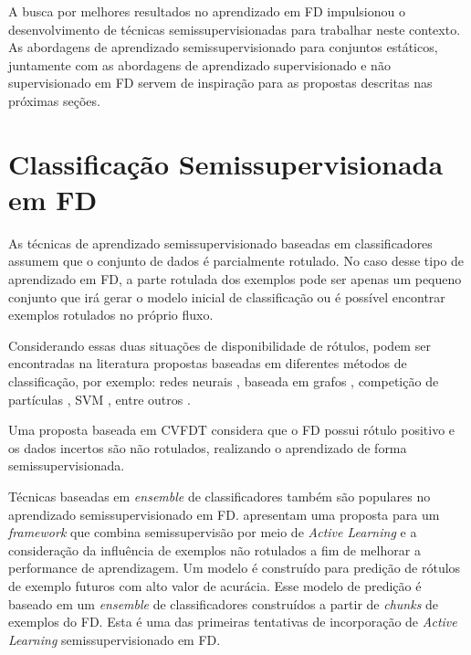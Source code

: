 
A busca por melhores resultados no aprendizado em FD impulsionou o desenvolvimento de técnicas semissupervisionadas para trabalhar neste contexto. As abordagens de aprendizado semissupervisionado para conjuntos estáticos, juntamente com as abordagens de aprendizado supervisionado e não supervisionado em FD servem de inspiração para as propostas descritas nas próximas seções.

\section{Classificação Semissupervisionada em FD}

As técnicas de aprendizado semissupervisionado baseadas em classificadores assumem que o conjunto de dados é parcialmente rotulado. No caso desse tipo de aprendizado em FD, a parte rotulada dos exemplos pode ser apenas um pequeno conjunto que irá gerar o modelo inicial de classificação ou é possível encontrar exemplos rotulados no próprio fluxo.

Considerando essas duas situações de disponibilidade de rótulos, podem ser encontradas na literatura propostas baseadas em diferentes métodos de classificação, por exemplo: redes neurais \cite{Leite2010,Astudillo2011,Astudillo2013,Bouguelia2013,Kasabov2013}, baseada em grafos \cite{Tiwari2010,Bertini2012,Bertini2013}, competição de partículas \cite{Breve2012,Breve2013}, SVM \cite{Frandina2013}, entre outros \cite{Pan2007,FdezRiverola2007,DeSilva2011}.

Uma proposta \cite{Liang2012} baseada em CVFDT considera que o FD possui rótulo positivo e os dados incertos são não rotulados, realizando o aprendizado de forma semissupervisionada.

Técnicas baseadas em \emph{ensemble} de classificadores também são populares no aprendizado semissupervisionado em FD.  apresentam uma proposta para um \emph{framework} que combina semissupervisão por meio de \emph{Active Learning} \cite{Settles2010} e a consideração da influência de exemplos não rotulados a fim de melhorar a performance de aprendizagem. Um modelo é construído para predição de rótulos de exemplo futuros com alto valor de acurácia. Esse modelo de predição é baseado em um \emph{ensemble} de classificadores construídos a partir de \emph{chunks} de exemplos do FD. Esta é uma das primeiras tentativas de incorporação de \emph{Active Learning} semissupervisionado em FD.

